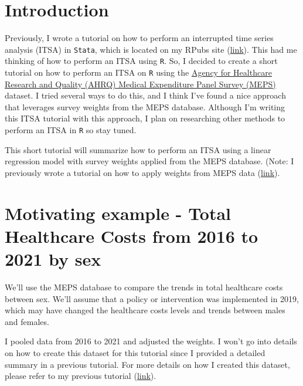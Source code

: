 \documentclass[
]{book}
\begin{document}
\hypertarget{introduction-5}{%
\section{Introduction}\label{introduction-5}}

Previously, I wrote a tutorial on how to perform an interrupted time series analysis (ITSA) in \texttt{Stata}, which is located on my RPubs site (\href{https://rpubs.com/mbounthavong/itsa_stata}{link}). This had me thinking of how to perform an ITSA using \texttt{R}. So, I decided to create a short tutorial on how to perform an ITSA on \texttt{R} using the \href{https://meps.ahrq.gov/mepsweb/}{Agency for Healthcare Research and Quality (AHRQ) Medical Expenditure Panel Survey (MEPS)} dataset. I tried several ways to do this, and I think I've found a nice approach that leverages survey weights from the MEPS database. Although I'm writing this ITSA tutorial with this approach, I plan on researching other methods to perform an ITSA in \texttt{R} so stay tuned.

This short tutorial will summarize how to perform an ITSA using a linear regression model with survey weights applied from the MEPS database. (Note: I previously wrote a tutorial on how to apply weights from MEPS data (\href{https://rpubs.com/mbounthavong/MEPS_tutorial_3_applying_weights}{link}).

\hypertarget{motivating-example---total-healthcare-costs-from-2016-to-2021-by-sex}{%
\section{Motivating example - Total Healthcare Costs from 2016 to 2021 by sex}\label{motivating-example---total-healthcare-costs-from-2016-to-2021-by-sex}}

We'll use the MEPS database to compare the trends in total healthcare costs between sex. We'll assume that a policy or intervention was implemented in 2019, which may have changed the healthcare costs levels and trends between males and females.

I pooled data from 2016 to 2021 and adjusted the weights. I won't go into details on how to create this dataset for this tutorial since I provided a detailed summary in a previous tutorial. For more details on how I created this dataset, please refer to my previous tutorial (\href{https://rpubs.com/mbounthavong/MEPS_tutorial_5_simple_trend_analysis}{link}).
\end{document}
